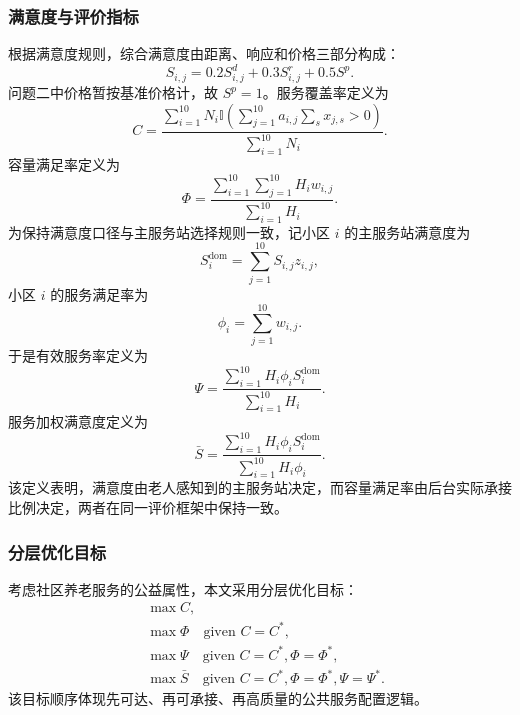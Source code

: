 \subsubsection{满意度与评价指标}

根据满意度规则，综合满意度由距离、响应和价格三部分构成：
\begin{equation}
S_{i,j}=0.2S_{i,j}^{d}+0.3S_{i,j}^{r}+0.5S^p.
\end{equation}
问题二中价格暂按基准价格计，故 $S^p=1$。服务覆盖率定义为
\begin{equation}
C=\frac{\sum_{i=1}^{10}N_i\mathbb{I}\left(\sum_{j=1}^{10}a_{i,j}\sum_sx_{j,s}>0\right)}{\sum_{i=1}^{10}N_i}.
\end{equation}
容量满足率定义为
\begin{equation}
\Phi=\frac{\sum_{i=1}^{10}\sum_{j=1}^{10}H_iw_{i,j}}{\sum_{i=1}^{10}H_i}.
\end{equation}
为保持满意度口径与主服务站选择规则一致，记小区 $i$ 的主服务站满意度为
\begin{equation}
S_i^{\mathrm{dom}}=\sum_{j=1}^{10}S_{i,j}z_{i,j},
\end{equation}
小区 $i$ 的服务满足率为
\begin{equation}
\phi_i=\sum_{j=1}^{10}w_{i,j}.
\end{equation}
于是有效服务率定义为
\begin{equation}
\Psi=\frac{\sum_{i=1}^{10}H_i\phi_iS_i^{\mathrm{dom}}}{\sum_{i=1}^{10}H_i}.
\end{equation}
服务加权满意度定义为
\begin{equation}
\bar{S}=\frac{\sum_{i=1}^{10}H_i\phi_iS_i^{\mathrm{dom}}}{\sum_{i=1}^{10}H_i\phi_i}.
\end{equation}
该定义表明，满意度由老人感知到的主服务站决定，而容量满足率由后台实际承接比例决定，两者在同一评价框架中保持一致。

\subsubsection{分层优化目标}

考虑社区养老服务的公益属性，本文采用分层优化目标：
\begin{align}
&\max C,\\
&\max \Phi \quad \text{given } C=C^*,\\
&\max \Psi \quad \text{given } C=C^*,\Phi=\Phi^*,\\
&\max \bar{S} \quad \text{given } C=C^*,\Phi=\Phi^*,\Psi=\Psi^*.
\end{align}
该目标顺序体现先可达、再可承接、再高质量的公共服务配置逻辑。

